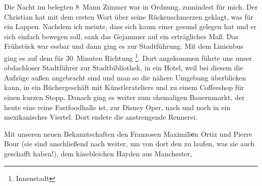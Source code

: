 Die Nacht im belegten 8~Mann Zimmer war in Ordnung, zumindest für mich.
Der Christian hat mit dem ersten Wort über seine Rückenschmerzen geklagt, was für ein Lappen.
Nachdem ich meinte, dass sich kaum einer gesund gelegen hat und er sich einfach bewegen soll, sank das Gejammer auf ein erträgliches Maß.
Das Frühstück war essbar und dann ging es zur Stadtführung.
Mit dem Linienbus ging es auf dem  für 30~Minuten Richtung \footnote{Innenstadt}.
Dort angekommen führte uns unser obdachloser Stadtführer zur Stadtbibliothek, in ein Hotel, weil bei diesem die Aufzüge außen angebracht sind und man so die nähere Umgebung überblicken kann, in ein Büchergeschäft mit Künstlerateliers und zu einem Coffeeshop für einen kurzen Stopp.
Danach ging es weiter zum ehemaligen Bauernmarkt, der heute eine reine Fastfoodhalle ist, zur Disney Oper, nach  und noch in ein mexikanisches Viertel.
Dort endete die anstrengende Rennerei.

Mit unseren neuen Bekanntschaften den Franzosen Maximili\textbf{e}n Ortiz und Pierre Bour (sie sind anschließend nach  weiter, um von dort den  zu laufen, was sie auch geschafft haben!), dem käsebleichen Hayden aus Manchester,


